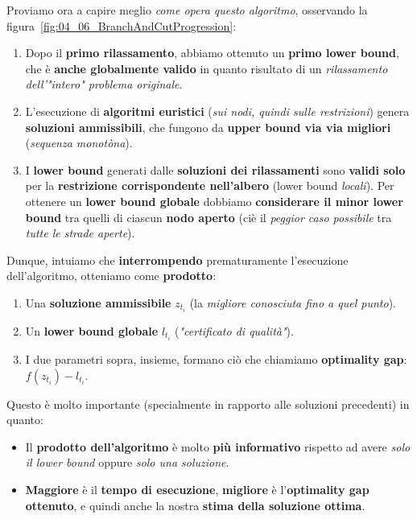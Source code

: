 Proviamo ora a capire meglio \textit{come opera questo algoritmo}, osservando 
la figura~\ref{fig:04_06_BranchAndCutProgression}:
\begin{enumerate}
    \item Dopo il \textbf{primo rilassamento}, abbiamo ottenuto un \textbf{primo lower bound},
        che è \textbf{anche globalmente valido} in quanto risultato di un
        \textit{rilassamento dell'"intero" problema originale}.
    \item L'esecuzione di \textbf{algoritmi euristici} (\textit{sui nodi, quindi sulle restrizioni}) 
        genera \textbf{soluzioni ammissibili}, che fungono da 
        \textbf{upper bound via via migliori} (\textit{sequenza monotòna}).
    \item I \textbf{lower bound} generati dalle \textbf{soluzioni dei rilassamenti} sono
        \textbf{validi solo} per la \textbf{restrizione corrispondente nell'albero} 
        (lower bound \textit{locali}). Per ottenere un \textbf{lower bound globale}
        dobbiamo \textbf{considerare il minor lower bound} tra quelli 
        di ciascun \textbf{nodo aperto} (ciè il \textit{peggior caso possibile} tra 
        \textit{tutte le strade aperte}).
\end{enumerate}

Dunque, intuiamo che \textbf{interrompendo} prematuramente l'esecuzione dell'algoritmo, otteniamo 
come \textbf{prodotto}:
\begin{enumerate}
    \item Una \textbf{soluzione ammissibile} $z_{t_i}$ (la \textit{migliore conosciuta fino a quel punto}).
    \item Un \textbf{lower bound globale} $l_{t_i}$ (\textit{"certificato di qualità"}).
    \item I due parametri sopra, insieme, formano ciò che chiamiamo
        \textbf{optimality gap}: $f(z_{t_i}) - l_{t_i}$.
\end{enumerate}

\begin{remark}[CONSEGUENZE]
    Questo è molto importante (specialmente in rapporto alle soluzioni precedenti) 
    in quanto:
    \begin{itemize}
        \item Il \textbf{prodotto dell'algoritmo} è molto \textbf{più informativo} rispetto
            ad avere \textit{solo il lower bound} oppure \textit{solo una soluzione}.
        \item \textbf{Maggiore} è il \textbf{tempo di esecuzione}, \textbf{migliore}
            è l'\textbf{optimality gap ottenuto}, e quindi anche la nostra 
            \textbf{stima della soluzione ottima}.
    \end{itemize}
\end{remark}

